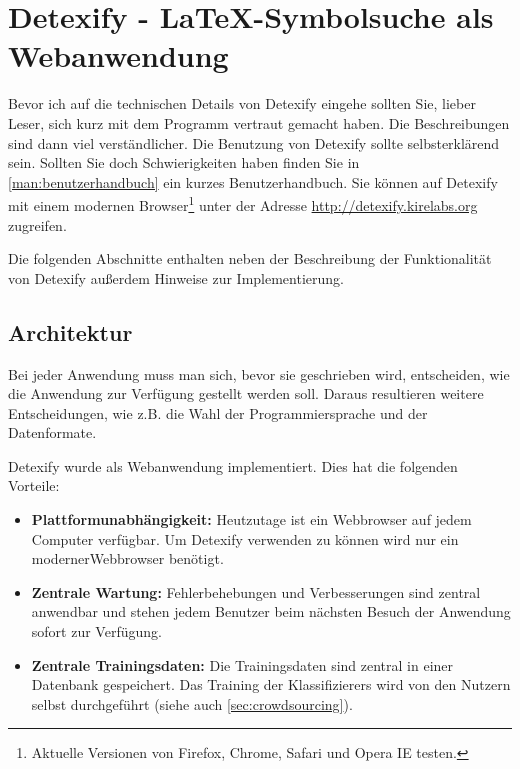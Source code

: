 \chapter[Detexify]{Detexify - \LaTeX-Symbolsuche als Webanwendung} %
\label{cha:detexify}

Bevor ich auf die technischen Details von Detexify eingehe sollten Sie, lieber Leser, sich kurz mit dem Programm vertraut gemacht haben. Die Beschreibungen sind dann viel verständlicher. Die Benutzung von Detexify sollte selbsterklärend sein. Sollten Sie doch Schwierigkeiten haben finden Sie in \ref{man:benutzerhandbuch} ein kurzes Benutzerhandbuch. Sie können auf Detexify mit einem modernen Browser\footnote{Aktuelle Versionen von Firefox, Chrome, Safari und Opera \TODO IE testen.} unter der Adresse \url{http://detexify.kirelabs.org} zugreifen.

Die folgenden Abschnitte enthalten neben der Beschreibung der Funktionalität von Detexify außerdem Hinweise zur Implementierung.

\section{Architektur} %
\label{sec:architektur}

Bei jeder Anwendung muss man sich, bevor sie geschrieben wird, entscheiden, wie die Anwendung zur Verfügung gestellt werden soll. Daraus resultieren weitere Entscheidungen, wie z.B. die Wahl der Programmiersprache und der Datenformate.

Detexify wurde als Webanwendung implementiert. Dies hat die folgenden Vorteile:

\begin{itemize}
  \item \textbf{Plattformunabhängigkeit:} Heutzutage ist ein Webbrowser auf jedem Computer verfügbar. Um Detexify verwenden zu können wird nur ein moderner\footnotemark[1] Webbrowser benötigt.
  \item \textbf{Zentrale Wartung:} Fehlerbehebungen und Verbesserungen sind zentral anwendbar und stehen jedem Benutzer beim nächsten Besuch der Anwendung sofort zur Verfügung.
  \item \textbf{Zentrale Trainingsdaten:} Die Trainingsdaten sind zentral in einer Datenbank gespeichert. Das Training der Klassifizierers wird von den Nutzern selbst durchgeführt (siehe auch \ref{sec:crowdsourcing}).
\end{itemize}

